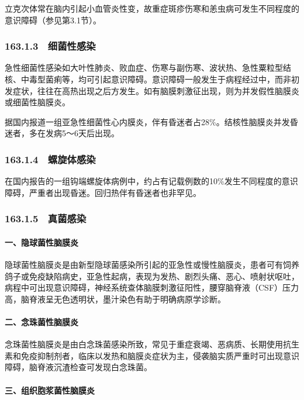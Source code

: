 立克次体常在脑内引起小血管炎性变，故重症斑疹伤寒和恙虫病可发生不同程度的意识障碍（参见第3.1节）。

\subsubsection{163.1.3　细菌性感染}

急性细菌性感染如大叶性肺炎、败血症、伤寒与副伤寒、波状热、急性粟粒型结核、中毒型菌痢等，均可引起意识障碍。意识障碍一般发生于病程经过中，而非初发症状，往往在高热出现之后方发生。如有脑膜刺激征出现，则为并发假性脑膜炎或细菌性脑膜炎。

据国内报道一组亚急性细菌性心内膜炎，伴有昏迷者占28\%。结核性脑膜炎并发昏迷者，多在发病5～6天后出现。

\subsubsection{163.1.4　螺旋体感染}

在国内报告的一组钩端螺旋体病例中，约占有记载例数的10\%发生不同程度的意识障碍，严重者出现昏迷。回归热伴有昏迷者也非罕见。

\subsubsection{163.1.5　真菌感染}

\paragraph{一、隐球菌性脑膜炎}

隐球菌性脑膜炎是由新型隐球菌感染所引起的亚急性或慢性脑膜炎，患者可有饲养鸽子或免疫缺陷病史，亚急性起病，表现为发热、剧烈头痛、恶心、喷射状呕吐，病程中可出现意识障碍，神经系统查体脑膜刺激征阳性，腰穿脑脊液（CSF）压力高，脑脊液呈无色透明状，墨汁染色有助于明确病原学诊断。

\paragraph{二、念珠菌性脑膜炎}

念珠菌性脑膜炎是由白念珠菌感染所致，常见于重症衰竭、恶病质、长期使用抗生素和免疫抑制剂者，临床以发热和脑膜炎症状为主，侵袭脑实质严重时可出现意识障碍，脑脊液沉渣检查可发现白念珠菌。

\paragraph{三、组织胞浆菌性脑膜炎}

